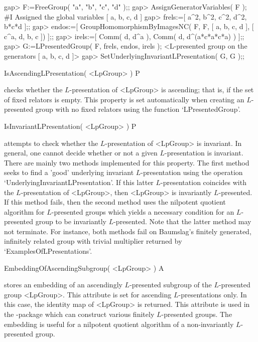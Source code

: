 \beginexample
gap> F:=FreeGroup( "a", "b", "c", "d" );;
gap> AssignGeneratorVariables( F );
#I  Assigned the global variables [ a, b, c, d ]
gap> frels:=[ a^2, b^2, c^2, d^2, b*c*d ];;
gap> endos:=[ GroupHomomorphismByImagesNC( F, F, [ a, b, c, d ], [ c^a, d, b, c ]) ];;
gap> irels:=[ Comm( d, d^a ), Comm( d, d^(a*c*a*c*a) ) ];;
gap> G:=LPresentedGroup( F, frels, endos, irels );
<L-presented group on the generators [ a, b, c, d ]>
gap> SetUnderlyingInvariantLPresentation( G, G );;
\endexample

\> IsAscendingLPresentation( <LpGroup> ) P

checks whether the $L$-presentation of <LpGroup> is ascending; that is,
if the set of fixed relators is empty. This property is set automatically
when creating an $L$-presented group with no fixed relators using the
function `LPresentedGroup'.

\> IsInvariantLPresentation( <LpGroup> ) P

attempts to check whether the $L$-presentation of <LpGroup>
is invariant. In general, one cannot decide whether or not a
given $L$-presentation is invariant. There are mainly two methods
implemented for this property. The first method seeks to find a 'good'
underlying invariant $L$-presentation using the operation
`UnderlyingInvariantLPresentation'. If this latter $L$-presentation
coincides with the $L$-presentation of <LpGroup>, then <LpGroup>
is invariantly $L$-presented. If this method fails, then the second
method uses the nilpotent quotient algorithm for $L$-presented groups
which yields a necessary condition for an $L$-presented group to
be invariantly $L$-presented. Note that the latter method may not
terminate. For instance, both methods fail on Baumslag's finitely
generated, infinitely related group with trivial multiplier returned by
`ExamplesOfLPresentations'.

\> EmbeddingOfAscendingSubgroup( <LpGroup> ) A 

stores an embedding of an ascendingly $L$-presented subgroup of the
$L$-presented group <LpGroup>. This attribute is set for ascending
$L$-presentations only. In this case, the identity map of <LpGroup> is
returned. This attribute is used in the \FR-package which can construct
various finitely $L$-presented groups. The embedding is useful for a
nilpotent quotient algorithm of a non-invariantly $L$-presented group.


